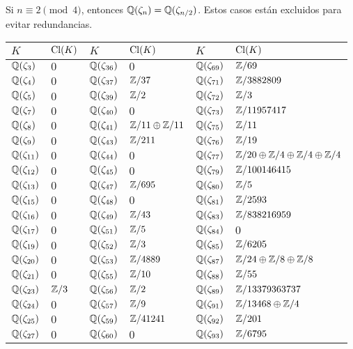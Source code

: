 Si $n \equiv 2 \pmod{4}$, entonces $\mathbb{Q} (\zeta_n) = \mathbb{Q} (\zeta_{n/2})$. Estos
casos están excluidos para evitar redundancias.


\begin{center}
\renewcommand{\arraystretch}{1.5}
\begin{tabular}{x{1cm}x{3cm}x{1cm}x{3.5cm}x{1.15cm}x{3.5cm}}
\hline
$K$ & $\operatorname{Cl} (K)$ & $K$ & $\operatorname{Cl} (K)$ & $K$ & $\operatorname{Cl} (K)$ \tabularnewline\hline
$\mathbb{Q} (\zeta_3)$ & $0$ & $\mathbb{Q} (\zeta_{36})$ & $0$ & $\mathbb{Q} (\zeta_{69})$ & $\mathbb{Z}/69$ \tabularnewline\hline
$\mathbb{Q} (\zeta_4)$ & $0$ & $\mathbb{Q} (\zeta_{37})$ & $\mathbb{Z}/37$ & $\mathbb{Q} (\zeta_{71})$ & $\mathbb{Z}/3882809$ \tabularnewline\hline
$\mathbb{Q} (\zeta_5)$ & $0$ & $\mathbb{Q} (\zeta_{39})$ & $\mathbb{Z}/2$ & $\mathbb{Q} (\zeta_{72})$ & $\mathbb{Z}/3$ \tabularnewline\hline
$\mathbb{Q} (\zeta_7)$ & $0$ & $\mathbb{Q} (\zeta_{40})$ & $0$ & $\mathbb{Q} (\zeta_{73})$ & $\mathbb{Z}/11957417$ \tabularnewline\hline
$\mathbb{Q} (\zeta_8)$ & $0$ & $\mathbb{Q} (\zeta_{41})$ & $\mathbb{Z}/11\oplus\mathbb{Z}/11$ & $\mathbb{Q} (\zeta_{75})$ & $\mathbb{Z}/11$ \tabularnewline\hline
$\mathbb{Q} (\zeta_9)$ & $0$ & $\mathbb{Q} (\zeta_{43})$ & $\mathbb{Z}/211$ & $\mathbb{Q} (\zeta_{76})$ & $\mathbb{Z}/19$ \tabularnewline\hline
$\mathbb{Q} (\zeta_{11})$ & $0$ & $\mathbb{Q} (\zeta_{44})$ & $0$ & $\mathbb{Q} (\zeta_{77})$ & $\mathbb{Z}/20\oplus\mathbb{Z}/4\oplus\mathbb{Z}/4\oplus\mathbb{Z}/4$ \tabularnewline\hline
$\mathbb{Q} (\zeta_{12})$ & $0$ & $\mathbb{Q} (\zeta_{45})$ & $0$ & $\mathbb{Q} (\zeta_{79})$ & $\mathbb{Z}/100146415$ \tabularnewline\hline
$\mathbb{Q} (\zeta_{13})$ & $0$ & $\mathbb{Q} (\zeta_{47})$ & $\mathbb{Z}/695$ & $\mathbb{Q} (\zeta_{80})$ & $\mathbb{Z}/5$ \tabularnewline\hline
$\mathbb{Q} (\zeta_{15})$ & $0$ & $\mathbb{Q} (\zeta_{48})$ & $0$ & $\mathbb{Q} (\zeta_{81})$ & $\mathbb{Z}/2593$ \tabularnewline\hline
$\mathbb{Q} (\zeta_{16})$ & $0$ & $\mathbb{Q} (\zeta_{49})$ & $\mathbb{Z}/43$ & $\mathbb{Q} (\zeta_{83})$ & $\mathbb{Z}/838216959$ \tabularnewline\hline
$\mathbb{Q} (\zeta_{17})$ & $0$ & $\mathbb{Q} (\zeta_{51})$ & $\mathbb{Z}/5$ & $\mathbb{Q} (\zeta_{84})$ & $0$ \tabularnewline\hline
$\mathbb{Q} (\zeta_{19})$ & $0$ & $\mathbb{Q} (\zeta_{52})$ & $\mathbb{Z}/3$ & $\mathbb{Q} (\zeta_{85})$ & $\mathbb{Z}/6205$ \tabularnewline\hline
$\mathbb{Q} (\zeta_{20})$ & $0$ & $\mathbb{Q} (\zeta_{53})$ & $\mathbb{Z}/4889$ & $\mathbb{Q} (\zeta_{87})$ & $\mathbb{Z}/24\oplus\mathbb{Z}/8\oplus\mathbb{Z}/8$ \tabularnewline\hline
$\mathbb{Q} (\zeta_{21})$ & $0$ & $\mathbb{Q} (\zeta_{55})$ & $\mathbb{Z}/10$ & $\mathbb{Q} (\zeta_{88})$ & $\mathbb{Z}/55$ \tabularnewline\hline
$\mathbb{Q} (\zeta_{23})$ & $\mathbb{Z}/3$ & $\mathbb{Q} (\zeta_{56})$ & $\mathbb{Z}/2$ & $\mathbb{Q} (\zeta_{89})$ & $\mathbb{Z}/13379363737$ \tabularnewline\hline
$\mathbb{Q} (\zeta_{24})$ & $0$ & $\mathbb{Q} (\zeta_{57})$ & $\mathbb{Z}/9$ & $\mathbb{Q} (\zeta_{91})$ & $\mathbb{Z}/13468\oplus\mathbb{Z}/4$ \tabularnewline\hline
$\mathbb{Q} (\zeta_{25})$ & $0$ & $\mathbb{Q} (\zeta_{59})$ & $\mathbb{Z}/41241$ & $\mathbb{Q} (\zeta_{92})$ & $\mathbb{Z}/201$ \tabularnewline\hline
$\mathbb{Q} (\zeta_{27})$ & $0$ & $\mathbb{Q} (\zeta_{60})$ & $0$ & $\mathbb{Q} (\zeta_{93})$ & $\mathbb{Z}/6795$ \tabularnewline\hline

\end{tabular}
\end{center}
